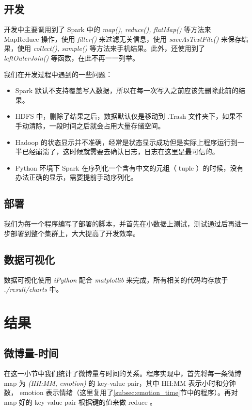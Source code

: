 \documentclass[12pt, oneside]{article}
\begin{document}
\begin{spacing}{1.5}
\begin{CJK}{UTF8}{gbsn}
\subsection{开发}
开发中主要调用到了 Spark 中的 {\it map(), reduce(), flatMap()} 等方法来 MapReduce 操作，使用 {\it filter()} 来过滤无关信息，使用 {\it saveAsTextFile()} 来保存结果，使用 {\it collect(), sample()} 等方法来手机结果。此外，还使用到了 {\it leftOuterJoin()} 等函数，在此不再一一列举。

我们在开发过程中遇到的一些问题：
\begin{itemize}
	\item Spark 默认不支持覆盖写入数据，所以在每一次写入之前应该先删除此前的结果。
	\item HDFS 中，删除了结果之后，数据默认仅是移动到 .Trash 文件夹下，如果不手动清除，一段时间之后就会占用大量存储空间。
	\item Hadoop 的状态显示并不准确，经常是状态显示成功但是实际上程序运行到一半已经崩溃了，这时候就需要去确认日志，日志在这里是最可信的。
	\item Python 环境下 Spark 在序列化一个含有中文的元组（ tuple ）的时候，没有办法正确的显示，需要提前手动序列化。
\end{itemize}

\subsection{部署}
我们为每一个程序编写了部署的脚本，并首先在小数据上测试，测试通过后再进一步部署到整个集群上，大大提高了开发效率。

\subsection{数据可视化}
数据可视化使用 {\it iPython} 配合 {\it matplotlib} 来完成，所有相关的代码均存放于 {\it ./result/charts} 中。

\newpage

\section{结果}
\subsection{微博量-时间}
\label{subsec:weibo_time}
在这一小节中我们统计了微博量与时间的关系。程序实现中，首先将每一条微博 map 为 {\it(HH:MM, emotion)} 的 key-value pair，其中 HH:MM 表示小时和分钟数， emotion 表示情绪（这里复用了\ref{subsec:emotion_time}节中的程序）。再对 map 好的 key-value pair 根据键的值来做 reduce 。 


\end{CJK}
\end{spacing}
\end{document}
